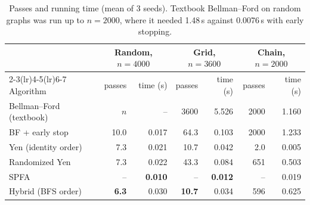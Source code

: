 \documentclass[11pt,a4paper]{article}
\theoremstyle{definition}
\begin{document}
\begin{table}[H]
\centering\small
\begin{tabular}{@{}lrrrrrr@{}}
\toprule
& \multicolumn{2}{c}{Random, $n=4000$} & \multicolumn{2}{c}{Grid, $n=3600$} & \multicolumn{2}{c}{Chain, $n=2000$}\\
\cmidrule(lr){2-3}\cmidrule(lr){4-5}\cmidrule(lr){6-7}
Algorithm & passes & time (s) & passes & time (s) & passes & time (s)\\
\midrule
Bellman--Ford (textbook) & $n$ & -- & 3600 & 5.526 & 2000 & 1.160\\
BF + early stop & 10.0 & 0.017 & 64.3 & 0.103 & 2000 & 1.233\\
Yen (identity order) & 7.3 & 0.021 & 10.7 & 0.042 & 2.0 & 0.005\\
Randomized Yen & 7.3 & 0.022 & 43.3 & 0.084 & 651 & 0.503\\
SPFA & -- & \textbf{0.010} & -- & \textbf{0.012} & -- & 0.019\\
Hybrid (BFS order) & \textbf{6.3} & 0.030 & \textbf{10.7} & 0.034 & 596 & 0.625\\
\bottomrule
\end{tabular}
\caption{Passes and running time (mean of 3 seeds). Textbook Bellman--Ford on random graphs was run up to $n=2000$, where it needed 1.48\,s against 0.0076\,s with early stopping.}
\label{tab:noneg}
\end{table}
\end{document}
